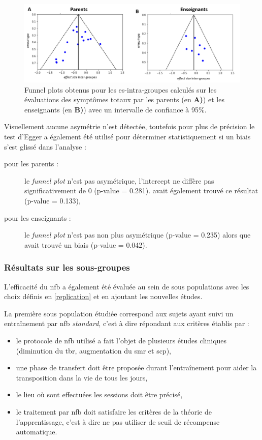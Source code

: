 \begin{figure}[h!]
  \centering
	\includegraphics[width=1\linewidth]{figures/chapter-2/meta-analysis-funnel-plots} 
  \caption{Funnel plots obtenus pour les \gls{es}-intra-groupes calculés sur les évaluations des symptômes totaux par les parents (en \textbf{A)}) et 
	les enseignants (en \textbf{B)}) avec un intervalle de confiance à 95\%.}
  \label{Figure:meta_analysis_funnel_plots}
\end{figure}

Visuellement aucune asymétrie n'est détectée, toutefois pour plus de précision le test d'Egger a également été utilisé pour déterminer statistiquement 
si un biais s'est glissé dans l'analyse :
\begin{description}
\item[pour les parents :] le \textit{funnel plot} n'est pas asymétrique, l'intercept ne diffère pas significativement de 0 (p-value = 0.281). \citet{Cortese2016}
avait également trouvé ce résultat (p-value = 0.133),
\item[pour les enseignants :]  le \textit{funnel plot} n'est pas non plus asymétrique (p-value = 0.235) alors que \citet{Cortese2016} avait trouvé un biais
(p-value = 0.042).
\end{description}

\subsubsection{Résultats sur les sous-groupes}

L'efficacité du \gls{nfb} a également été évaluée au sein de sous populations \citep{Cortese2016} avec les choix définis en \ref{replication} et en ajoutant
les nouvelles études. 

La première sous population étudiée correspond aux sujets ayant suivi un entraînement par \gls{nfb} \emph{standard}, c'est à dire répondant aux critères établis
par \citet{Arns2014} :
\begin{itemize}
\item le protocole de \gls{nfb} utilisé a fait l'objet de plusieurs études cliniques (diminution du \gls{tbr}, augmentation du \gls{smr} et \gls{scp}),
\item une phase de transfert doit être proposée durant l'entraînement pour aider la transposition dans la vie de tous les jours,
\item le lieu où sont effectuées les sessions doit être précisé,
\item le traitement par \gls{nfb} doit satisfaire les critères de la théorie de l'apprentissage, c'est à dire ne pas utiliser de seuil de récompense automatique.
\end{itemize}

